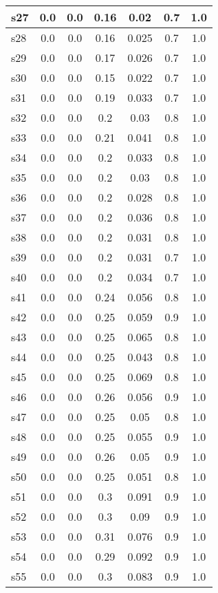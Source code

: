 \documentclass{article}
\begin{document}
\begin{tabular}{|l|c|c|c|c|c|c|}
\hline
s27 &0.0 & 0.0 & 0.16 & 0.02 & 0.7 & 1.0\\
\hline
s28 &0.0 & 0.0 & 0.16 & 0.025 & 0.7 & 1.0\\
\hline
s29 &0.0 & 0.0 & 0.17 & 0.026 & 0.7 & 1.0\\
\hline
s30 &0.0 & 0.0 & 0.15 & 0.022 & 0.7 & 1.0\\
\hline
s31 &0.0 & 0.0 & 0.19 & 0.033 & 0.7 & 1.0\\
\hline
s32 &0.0 & 0.0 & 0.2 & 0.03 & 0.8 & 1.0\\
\hline
s33 &0.0 & 0.0 & 0.21 & 0.041 & 0.8 & 1.0\\
\hline
s34 &0.0 & 0.0 & 0.2 & 0.033 & 0.8 & 1.0\\
\hline
s35 &0.0 & 0.0 & 0.2 & 0.03 & 0.8 & 1.0\\
\hline
s36 &0.0 & 0.0 & 0.2 & 0.028 & 0.8 & 1.0\\
\hline
s37 &0.0 & 0.0 & 0.2 & 0.036 & 0.8 & 1.0\\
\hline
s38 &0.0 & 0.0 & 0.2 & 0.031 & 0.8 & 1.0\\
\hline
s39 &0.0 & 0.0 & 0.2 & 0.031 & 0.7 & 1.0\\
\hline
s40 &0.0 & 0.0 & 0.2 & 0.034 & 0.7 & 1.0\\
\hline
s41 &0.0 & 0.0 & 0.24 & 0.056 & 0.8 & 1.0\\
\hline
s42 &0.0 & 0.0 & 0.25 & 0.059 & 0.9 & 1.0\\
\hline
s43 &0.0 & 0.0 & 0.25 & 0.065 & 0.8 & 1.0\\
\hline
s44 &0.0 & 0.0 & 0.25 & 0.043 & 0.8 & 1.0\\
\hline
s45 &0.0 & 0.0 & 0.25 & 0.069 & 0.8 & 1.0\\
\hline
s46 &0.0 & 0.0 & 0.26 & 0.056 & 0.9 & 1.0\\
\hline
s47 &0.0 & 0.0 & 0.25 & 0.05 & 0.8 & 1.0\\
\hline
s48 &0.0 & 0.0 & 0.25 & 0.055 & 0.9 & 1.0\\
\hline
s49 &0.0 & 0.0 & 0.26 & 0.05 & 0.9 & 1.0\\
\hline
s50 &0.0 & 0.0 & 0.25 & 0.051 & 0.8 & 1.0\\
\hline
s51 &0.0 & 0.0 & 0.3 & 0.091 & 0.9 & 1.0\\
\hline
s52 &0.0 & 0.0 & 0.3 & 0.09 & 0.9 & 1.0\\
\hline
s53 &0.0 & 0.0 & 0.31 & 0.076 & 0.9 & 1.0\\
\hline
s54 &0.0 & 0.0 & 0.29 & 0.092 & 0.9 & 1.0\\
\hline
s55 &0.0 & 0.0 & 0.3 & 0.083 & 0.9 & 1.0\\

\end{tabular}
\end{document}
